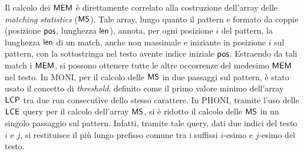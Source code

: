 \documentclass[a4paper,11pt, oneside,italian]{article}
\def\LCE{\mbox{\rm {\sf LCE}}}
\def\len{\mbox{\rm {\sf len}}}
\def\pos{\mbox{\rm {\sf pos}}}
\def\LCP{\mbox{\rm {\sf LCP}}}
\def\MEM{\mbox{\rm {\sf MEM}}}
\def\MS{\mbox{\rm {\sf MS}}}
\def\LCP{\mbox{\rm {\sf LCP}}}
\def\LCE{\mbox{\rm {\sf LCE}}}
\begin{document}
Il calcolo dei $\MEM$ è direttamente
correlato alla costruzione dell'array delle \textit{matching statistics}
($\MS$). Tale array, lungo quanto il pattern e formato da coppie (posizione
$\pos$, lunghezza $\len$), annota, per ogni posizione $i$ del pattern, la
lunghezza $\len$ di un match, anche non massimale e iniziante in posizione $i$
sul pattern, con la sottostringa nel testo avente 
indice iniziale $\pos$.
Estraendo da tali match i $\MEM$, si possono ottenere
tutte le altre occorrenze del medesimo $\MEM$ nel testo. 
In MONI, per il calcolo delle $\MS$ in due passaggi sul pattern, è stato
usato il concetto di \textit{threshold}, definito come
il primo valore minimo dell'array $\LCP$ tra due run consecutive dello stesso
carattere. In PHONI, tramite
l'uso delle $\LCE$ query per il calcolo dell'array $\MS$, si è ridotto il
calcolo delle $\MS$
in un singolo passaggio sul pattern. Infatti, tramite tale
query, dati due indici del testo $i$ e $j$, si restituisce il più lungo
prefisso comune tra i suffissi $i$-esimo e $j$-esimo del testo.


\end{document}
